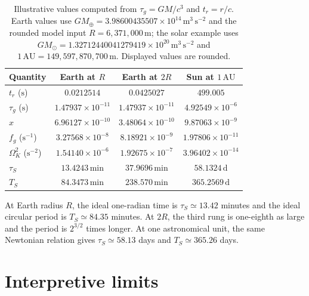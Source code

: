 \documentclass[12pt]{article}
\begin{document}
\begin{table}[ht]
  \centering
  \small
  \begin{tabular}{@{}lccc@{}}
    \toprule
    Quantity & Earth at $R$ & Earth at $2R$ & Sun at $1\,\mathrm{AU}$ \\
    \midrule
    $t_r$ ($\mathrm{s}$) & $0.0212514$ & $0.0425027$ & $499.005$ \\
    $\tau_g$ ($\mathrm{s}$) & $1.47937\times10^{-11}$ & $1.47937\times10^{-11}$ & $4.92549\times10^{-6}$ \\
    $x$ & $6.96127\times10^{-10}$ & $3.48064\times10^{-10}$ & $9.87063\times10^{-9}$ \\
    $f_g$ ($\mathrm{s^{-1}}$) & $3.27568\times10^{-8}$ & $8.18921\times10^{-9}$ & $1.97806\times10^{-11}$ \\
    $\Omega_K^2$ ($\mathrm{s^{-2}}$) & $1.54140\times10^{-6}$ & $1.92675\times10^{-7}$ & $3.96402\times10^{-14}$ \\
    $\tau_S$ & $13.4243\,\mathrm{min}$ & $37.9696\,\mathrm{min}$ & $58.1324\,\mathrm{d}$ \\
    $T_S$ & $84.3473\,\mathrm{min}$ & $238.570\,\mathrm{min}$ & $365.2569\,\mathrm{d}$ \\
    \bottomrule
  \end{tabular}
  \caption{Illustrative values computed from $\tau_g=GM/c^3$ and $t_r=r/c$. Earth values use $GM_\oplus=3.98600435507\times10^{14}\,\mathrm{m^3\,s^{-2}}$ and the rounded model input $R=6{,}371{,}000\,\mathrm{m}$; the solar example uses $GM_\odot=1.32712440041279419\times10^{20}\,\mathrm{m^3\,s^{-2}}$ and $1\,\mathrm{AU}=149{,}597{,}870{,}700\,\mathrm{m}$. Displayed values are rounded.}
  \label{tab:scale-examples}
\end{table}

At Earth radius $R$, the ideal one-radian time is $\tau_S\simeq13.42$ minutes and the ideal circular period is $T_S\simeq84.35$ minutes. At $2R$, the third rung is one-eighth as large and the period is $2^{3/2}$ times longer. At one astronomical unit, the same Newtonian relation gives $\tau_S\simeq58.13$ days and $T_S\simeq365.26$ days.

\section{Interpretive limits}
\label{sec:limits}
\end{document}
